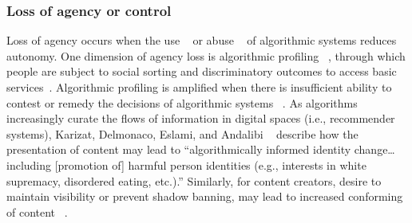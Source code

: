 \subsubsection{Loss of agency or control} Loss of agency occurs when the use ~\cite{Keyes_2018, Malik_Viljanen_Lepinkainen_Alvesalo-Kuusi_Others} or abuse ~\cite{McGlynn_Rackley_2017} of algorithmic systems reduces autonomy. One dimension of agency loss is algorithmic profiling ~\cite{Mann_Matzner_2019}, through which people are subject to social sorting and discriminatory outcomes to access basic services~\cite{Sambasivan_Arnesen_Hutchinson_Doshi_Prabhakaran_2021}. Algorithmic profiling is amplified when there is insufficient ability to contest or remedy the decisions of algorithmic systems ~\cite{Dean_Gilbert_Lambert_Zick_2021, Angwin_Parris_2016, Smith_2021}. As algorithms increasingly curate the flows of information in digital spaces (i.e., recommender systems), Karizat, Delmonaco, Eslami, and Andalibi ~\cite[p. 20]{Karizat_2021} describe how the presentation of content may lead to “algorithmically informed identity change… including [promotion of] harmful person identities (e.g., interests in white supremacy, disordered eating, etc.).” Similarly, for content creators, desire to maintain visibility or prevent shadow banning, may lead to increased conforming of content ~\cite{Thiago_Marcelo_Gomes_2021}.

